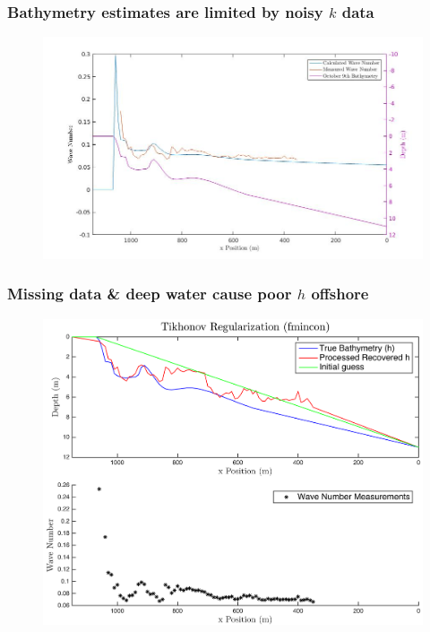 \documentclass[7pt]{beamer}
\begin{document}
\begin{frame}
	\frametitle{Bathymetry estimates are limited by noisy $k$ data}
		\begin{figure}
			\includegraphics[width=1\linewidth]{img/Real_vs_Calcd_wavenum.jpg}
		\end{figure}
	
\end{frame}

\begin{frame}
	\frametitle{Missing data \& deep water cause poor $h$ offshore}
		\begin{figure}[H]
			\includegraphics[width=0.9\linewidth]{img/fmincon_real_Oct09.png}
	 	\end{figure}
\end{frame}
\end{document}
